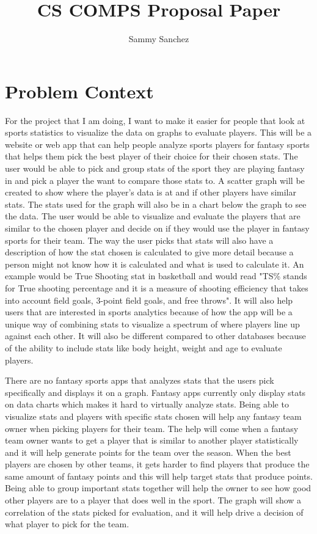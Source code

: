 \documentclass[10pt,twocolumn]{article}
\title{CS COMPS Proposal Paper}
\author{Sammy Sanchez}
\affiliation{Occidental College}
\begin{document}
\maketitle

\section{Problem Context}

For the project that I am doing, I want to make it easier for people that look at sports statistics to visualize the data on graphs to evaluate players. This will be a website or web app that can help people analyze sports players for fantasy sports that helps them pick the best player of their choice for their chosen stats. The user would be able to pick and group stats of the sport they are playing fantasy in and pick a player the want to compare those stats to. A scatter graph will be created to show where the player's data is at and if other players have similar stats. The stats used for the graph will also be in a chart below the graph to see the data. The user would be able to visualize and evaluate the players that are similar to the chosen player and decide on if they would use the player in fantasy sports for their team. The way the user picks that stats will also have a description of how the stat chosen is calculated to give more detail because a person might not know how it is calculated and what is used to calculate it. An example would be True Shooting stat in basketball and would read "TS\% stands for True shooting percentage and it is a measure of shooting efficiency that takes into account field goals, 3-point field goals, and free throws". It will also help users that are interested in sports analytics because of how the app will be a unique way of combining stats to visualize a spectrum of where players line up against each other. It will also be different compared to other databases because of the ability to include stats like body height, weight and age to evaluate players. 

There are no fantasy sports apps that analyzes stats that the users pick specifically and displays it on a graph. Fantasy apps currently only display stats on data charts which makes it hard to virtually analyze stats. Being able to visualize stats and players with specific stats chosen will help any fantasy team owner when picking players for their team. The help will come when a fantasy team owner wants to get a player that is similar to another player statistically and it will help generate points for the team over the season. When the best players are chosen by other teams, it gets harder to find players that produce the same amount of fantasy points and this will help target stats that produce points. Being able to group important stats together will help the owner to see how good other players are to a player that does well in the sport. The graph will show a correlation of the stats picked for evaluation, and it will help drive a decision of what player to pick for the team. 
\end{document}
